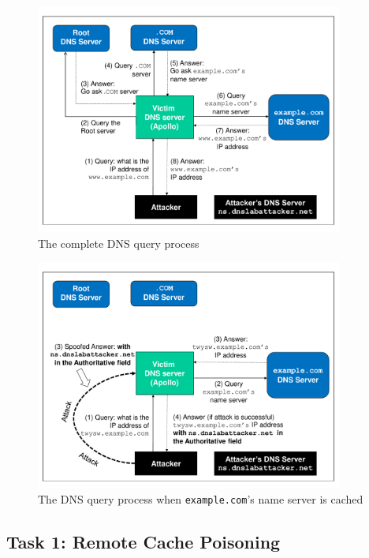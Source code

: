 \begin{figure}[!htb]
\centering
\includegraphics*[width=0.9\textwidth,natwidth=621,natheight=403]{Figs/DNS_Remote_Flow1.pdf}
\caption{The complete DNS query process} 
\label{fig:flow_diagram1}
\end{figure}


\begin{figure}[!htb]
\centering
\includegraphics*[width=0.9\textwidth,natwidth=621,natheight=403]{Figs/DNS_Remote_Flow2.pdf}
\caption{The DNS query process when {\tt example.com}'s name server is cached}
\label{fig:flow_diagram2}
\end{figure}


\subsection{Task 1: Remote Cache Poisoning}

